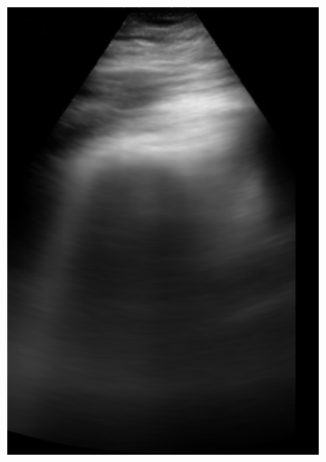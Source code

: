 \documentclass[12pt]{article} %
\begin{document}
\begin{figure}
\begin{subfigure}{0.3\textwidth}
		\includegraphics[width=\textwidth]{figuras/centroid_1.jpg}
		\end{subfigure}
		\begin{subfigure}{0.3\textwidth}
		\centering

\end{subfigure}
\end{figure}
\end{document}
